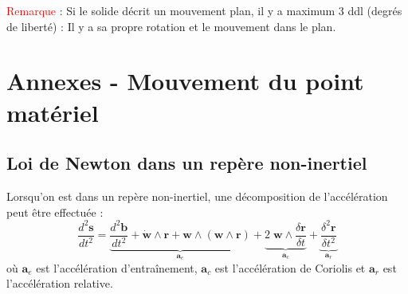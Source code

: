 \documentclass[a4paper]{article}
\begin{document}
\textcolor{red}{Remarque} : Si le solide décrit un mouvement plan, il y a maximum 3 ddl (degrés de liberté) : Il y a sa propre rotation et le mouvement dans le plan.





















































\newpage










\appendix










\section{Annexes - Mouvement du point matériel}





\subsection{Loi de Newton dans un repère non-inertiel}





Lorsqu'on est dans un repère non-inertiel, une décomposition de l'accélération peut être effectuée : 
\[ \frac{d^2 \textbf{s}}{d t^2} = \underbrace{ \frac{d^2 \textbf{b}}{d t^2} + \dot{\textbf{w}} \wedge \textbf{r} + \textbf{w} \wedge (\textbf{w} \wedge \textbf{r}) }_{\textbf{a}_e} + \underbrace{ 2 \; \textbf{w} \wedge \frac{\delta \textbf{r}}{\delta t} }_{\textbf{a}_c} + \underbrace{ \frac{\delta^2 \textbf{r}}{\delta t^2} }_{\textbf{a}_r} \]
où $ \textbf{a}_e $ est l'accélération d'entraînement, $ \textbf{a}_c $ est l'accélération de Coriolis et $ \textbf{a}_r $ est l'accélération relative.
\end{document}

